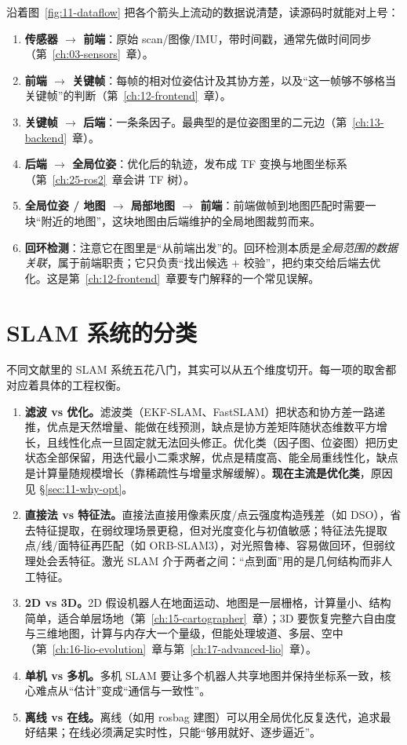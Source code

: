 沿着图~\ref{fig:11-dataflow} 把各个箭头上流动的数据说清楚，读源码时就能对上号：
\begin{enumerate}
  \item \textbf{传感器 $\rightarrow$ 前端}：原始 scan/图像/IMU，带时间戳，通常先做时间同步（第~\ref{ch:03-sensors}~章）。
  \item \textbf{前端 $\rightarrow$ 关键帧}：每帧的相对位姿估计及其协方差，以及``这一帧够不够格当关键帧''的判断（第~\ref{ch:12-frontend}~章）。
  \item \textbf{关键帧 $\rightarrow$ 后端}：一条条因子。最典型的是位姿图里的二元边（第~\ref{ch:13-backend}~章）。
  \item \textbf{后端 $\rightarrow$ 全局位姿}：优化后的轨迹，发布成 TF 变换与地图坐标系（第~\ref{ch:25-ros2}~章会讲 TF 树）。
  \item \textbf{全局位姿 / 地图 $\rightarrow$ 局部地图 $\rightarrow$ 前端}：前端做帧到地图匹配时需要一块``附近的地图''，这块地图由后端维护的全局地图裁剪而来。
  \item \textbf{回环检测}：注意它在图里是``从前端出发''的。回环检测本质是\emph{全局范围的数据关联}，属于前端职责；它只负责``找出候选 + 校验''，把约束交给后端去优化。这是第~\ref{ch:12-frontend}~章要专门解释的一个常见误解。
\end{enumerate}

\section{SLAM 系统的分类}\label{sec:11-taxonomy}

不同文献里的 SLAM 系统五花八门，其实可以从五个维度切开。每一项的取舍都对应着具体的工程权衡。

\begin{enumerate}
  \item \textbf{滤波 vs 优化。}滤波类（EKF-SLAM、FastSLAM）把状态和协方差一路递推，优点是天然增量、能做在线预测，缺点是协方差矩阵随状态维数平方增长，且线性化点一旦固定就无法回头修正。优化类（因子图、位姿图）把历史状态全部保留，用迭代最小二乘求解，优点是精度高、能全局重线性化，缺点是计算量随规模增长（靠稀疏性与增量求解缓解）。\textbf{现在主流是优化类}，原因见 \S\ref{sec:11-why-opt}。
  \item \textbf{直接法 vs 特征法。}直接法直接用像素灰度/点云强度构造残差（如 DSO\cite{engel2018dso}），省去特征提取，在弱纹理场景更稳，但对光度变化与初值敏感；特征法先提取点/线/面特征再匹配（如 ORB-SLAM3\cite{campos2021orbslam3}），对光照鲁棒、容易做回环，但弱纹理处会丢特征。激光 SLAM 介于两者之间：``点到面''用的是几何结构而非人工特征。
  \item \textbf{2D vs 3D。}2D 假设机器人在地面运动、地图是一层栅格，计算量小、结构简单，适合单层场地（第~\ref{ch:15-cartographer}~章）；3D 要恢复完整六自由度与三维地图，计算与内存大一个量级，但能处理坡道、多层、空中（第~\ref{ch:16-lio-evolution}~章与第~\ref{ch:17-advanced-lio}~章）。
  \item \textbf{单机 vs 多机。}多机 SLAM 要让多个机器人共享地图并保持坐标系一致，核心难点从``估计''变成``通信与一致性''。
  \item \textbf{离线 vs 在线。}离线（如用 rosbag 建图）可以用全局优化反复迭代，追求最好结果；在线必须满足实时性，只能``够用就好、逐步逼近''。
\end{enumerate}

